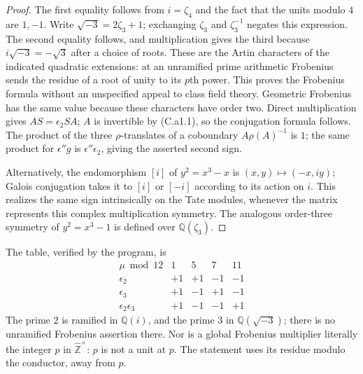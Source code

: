 \begin{proof}
The first equality follows from $i=\zeta_4$ and the fact that the units
modulo $4$ are $1,-1$. Write $\sqrt{-3}=2\zeta_3+1$; exchanging
$\zeta_3$ and $\zeta_3^{-1}$ negates this expression. The second equality
follows, and multiplication gives the third because
$i\sqrt{-3}=-\sqrt3$ after a choice of roots. These are the Artin
characters of the indicated quadratic extensions: at an unramified prime
arithmetic Frobenius sends the residue of a root of unity to its $p$th
power. This proves the Frobenius formula without an unspecified appeal to
class field theory. Geometric Frobenius has the same value because these
characters have order two. Direct multiplication gives $AS=\epsilon_2SA$;
$A$ is invertible by (C.a1.1), so the conjugation formula follows. The product of the three $\rho$-translates
of a coboundary $A\rho(A)^{-1}$ is $1$; the same product for
$\epsilon''g$ is $\epsilon''\epsilon_2$, giving the asserted second sign.

Alternatively, the endomorphism $[i]$ of $y^2=x^3-x$ is
$(x,y)\mapsto(-x,iy)$; Galois conjugation takes it to $[i]$ or $[-i]$
according to its action on $i$. This realizes the same sign intrinsically
on the Tate modules, whenever the matrix represents this complex
multiplication symmetry. The analogous order-three symmetry of
$y^2=x^3-1$ is defined over $\mathbb Q(\zeta_3)$.
\end{proof}
The table, verified by the program, is
\[
\begin{array}{c|rrrr}
 \mu\bmod12&1&5&7&11\\\hline
 \epsilon_2&+1&+1&-1&-1\\
 \epsilon_3&+1&-1&+1&-1\\
 \epsilon_2\epsilon_3&+1&-1&-1&+1
\end{array}
\]
The prime $2$ is ramified in $\mathbb Q(i)$, and the prime $3$ in
$\mathbb Q(\sqrt{-3})$; there is no unramified Frobenius assertion there.
Nor is a global Frobenius multiplier literally the integer $p$ in
$\widehat{\mathbb Z}^{\times}$: $p$ is not a unit at $p$. The statement
uses its residue modulo the conductor, away from $p$.

